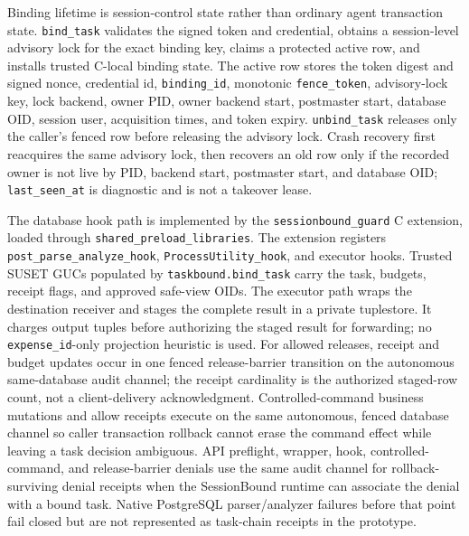 \documentclass[journal]{IEEEtran}
\begin{document}
Binding lifetime is session-control state rather than ordinary agent
transaction state. \texttt{bind\_task} validates the signed token and
credential, obtains a session-level advisory lock for the exact binding
key, claims a protected active row, and installs trusted C-local binding
state. The active row stores the token digest and signed nonce,
credential id, \texttt{binding\_id}, monotonic \texttt{fence\_token},
advisory-lock key, lock backend, owner PID, owner backend start,
postmaster start, database OID, session user, acquisition times, and
token expiry. \texttt{unbind\_task} releases only the caller's fenced row
before releasing the advisory lock. Crash recovery first reacquires the
same advisory lock, then recovers an old row only if the recorded owner
is not live by PID, backend start, postmaster start, and database OID;
\texttt{last\_seen\_at} is diagnostic and is not a takeover lease.

The database hook path is implemented by the
\texttt{sessionbound\_guard} C extension, loaded through
\texttt{shared\_preload\_libraries}. The extension registers
\texttt{post\_parse\_analyze\_hook}, \texttt{ProcessUtility\_hook}, and
executor hooks. Trusted SUSET GUCs populated by
\texttt{taskbound.bind\_task} carry the task, budgets, receipt flags, and
approved safe-view OIDs. The executor path wraps the destination
receiver and stages the complete result in a private tuplestore. It
charges output tuples before authorizing the staged result for forwarding;
no \texttt{expense\_id}-only projection heuristic is used. For allowed
releases, receipt and budget updates occur in one fenced release-barrier
transition on the autonomous same-database audit channel; the receipt
cardinality is the authorized staged-row count, not a client-delivery
acknowledgment. Controlled-command business mutations and allow receipts
execute on the same autonomous, fenced database channel so caller
transaction rollback cannot erase the command effect while leaving a task
decision ambiguous. API preflight, wrapper, hook, controlled-command, and
release-barrier denials use the same audit channel for rollback-surviving
denial receipts when the SessionBound runtime can associate the denial
with a bound task. Native
PostgreSQL parser/analyzer failures before that point fail closed but are
not represented as task-chain receipts in the prototype.
\end{document}
